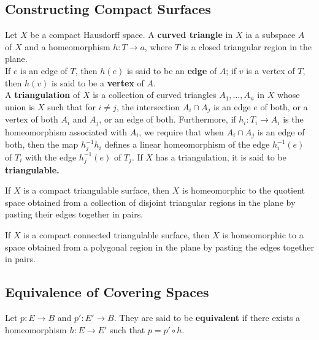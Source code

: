 \subsection{Constructing Compact Surfaces}

\begin{definition}
Let $X$ be a compact Hausdorff space. A \textbf{curved triangle} in $X$ ia a subspace $A$ of $X$ and a homeomorphism $h \colon T \rightarrow a$, 
where $T$ is a closed triangular region in the plane. \\

If $e$ is an edge of $T$, then $h(e)$ is said to be an \textbf{edge} of $A$; if $v$ is a vertex of $T$, then $h(v)$ is said to be a \textbf{vertex} of $A$. \\

A \textbf{triangulation} of $X$ is a collection of curved triangles $A_1, \dots, A_n$ in $X$ whose union is $X$ such that for $i \neq j$, 
the intersection $A_i \cap A_j$ is an edge $e$ of both, or a vertex of both $A_i$ and $A_j$, or an edge of both. Furthermore, if $h_i \colon T_i \rightarrow A_i$ is the
homeomorphism associated with $A_i$, we require that when $A_i \cap A_j$ is an edge of both, then the map $h_j^{-1}h_i$ defines a linear homeomorphism
of the edge $h_i^{-1}(e)$ of $T_i$ with the edge $h_j^{-1}(e)$ of $T_j$. If $X$ has a triangulation, it is said to be \textbf{triangulable.}
\end{definition}

\begin{theorem}
If $X$ is a compact triangulable surface, then $X$ is homeomorphic to the quotient space obtained from a collection of disjoint triangular regions in the plane
by pasting their edges together in pairs.
\end{theorem}

\begin{theorem}
If $X$ is a compact connected triangulable surface, then $X$ is homeomorphic to a space obtained from a polygonal region in the plane by pasting the edges together in pairs.
\end{theorem}

\subsection{Equivalence of Covering Spaces}

\begin{definition}
Let $p \colon E \rightarrow B$ and $p' \colon E' \rightarrow B$. They are said to be \textbf{equivalent} if there exists a homeomorphism
$h \colon E \rightarrow E'$ such that $p = p' \circ h$. 
\end{definition}

